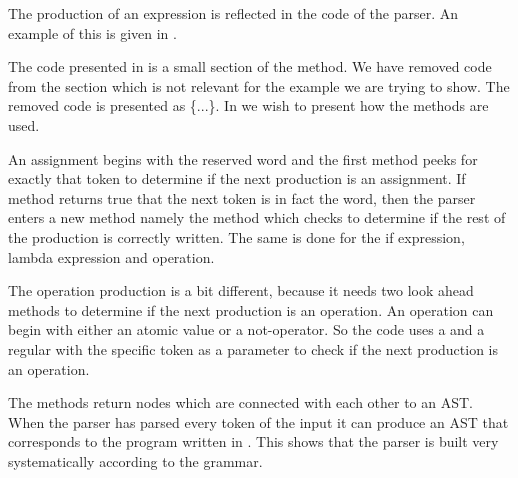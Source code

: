 \begin{ebnf}
\end{ebnf}

The production of an expression is reflected in the code of the parser. An example of this is given in .



The code presented in  is a small section of the  method. We have removed code from the section which is not relevant for the example we are trying to show. The removed code is presented as \{...\}. In  we wish to present how the  methods are used.

An assignment begins with the reserved word  and the first  method peeks for exactly that token to determine if the next production is an assignment. If method returns true that the next token is in fact the  word, then the parser enters a new method namely the  method which checks to determine if the rest of the production is correctly written. The same is done for the if expression, lambda expression and operation.

The operation production is a bit different, because it needs two look ahead methods to determine if the next production is an operation. An operation can begin with either an atomic value or a not-operator. So the code uses a  and a regular  with the specific token as a parameter to check if the next production is an operation.

The methods return nodes which are connected with each other to an AST.
When the parser has parsed every token of the input it can produce an AST that corresponds to the program written in \productname{}. This shows that the parser is built very systematically according to the grammar.

